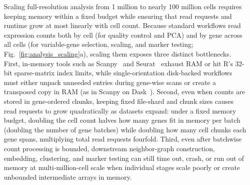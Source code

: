\documentclass[11pt]{article}
\begin{document}
Scaling full-resolution analysis from 1 million to nearly 100 million cells requires keeping memory within a fixed budget while ensuring that read requests and runtime grow at most linearly with cell count. Because standard workflows read expression counts both by cell (for quality control and PCA) and by gene across all cells (for variable-gene selection, scaling, and marker testing; Fig.~\ref{fig:analysis_scaling}a), scaling them exposes three distinct bottlenecks. First, in-memory tools such as Scanpy~\cite{wolf2018} and Seurat~\cite{hao2024seurat} exhaust RAM or hit R's 32-bit sparse-matrix index limits, while single-orientation disk-backed workflows must either unpack unneeded entries during gene-wise scans or create a transposed copy in RAM (as in Scanpy on Dask~\cite{scanpydask}). Second, even when counts are stored in gene-ordered chunks, keeping fixed file-shard and chunk sizes causes read requests to grow quadratically as datasets expand: under a fixed memory budget, doubling the cell count halves how many genes fit in memory per batch (doubling the number of gene batches) while doubling how many cell chunks each gene spans, multiplying total read requests fourfold. Third, even after batchwise count processing is bounded, downstream neighbor-graph construction, embedding, clustering, and marker testing can still time out, crash, or run out of memory at multi-million-cell scale when individual stages scale poorly or create unbounded intermediate arrays in memory.
\end{document}
